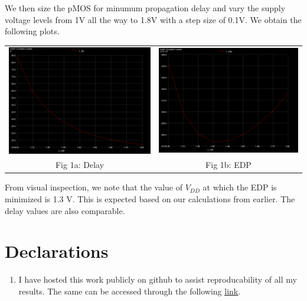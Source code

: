 \documentclass[12pt,a4paper]{article}
\begin{document}
\noindent We then size the pMOS for minumum propagation delay and vary the supply voltage levels from 1V all the way to 1.8V with a step size of 0.1V. We obtain the following plots.
\begin{center}
\begin{tabular}{cc}
     \includegraphics[width=0.49\linewidth]{tut3/reports/media/dly.png} &
     \includegraphics[width=0.49\linewidth]{tut3/reports/media/edp.png} \\
     Fig 1a: Delay & Fig 1b: EDP
\end{tabular}
\end{center}

\noindent From visual inspection, we note that the value of $V_{DD}$ at which the EDP is minimized is 1.3 V. This is expected based on our calculations from earlier. The delay values are also comparable.

\section{Declarations}
\begin{enumerate}
    \item I have hosted this work publicly on github to assist reproducability of all my results. The same can be accessed through the following \href{https://github.com/iamkarthikbk/ee5311-2025}{\underline{link}}.
\end{enumerate}
\end{document}
